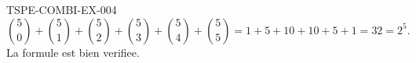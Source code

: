 \begin{corrige}{TSPE-COMBI-EX-004}
\[
  \binom{5}{0}+\binom{5}{1}+\binom{5}{2}+\binom{5}{3}+\binom{5}{4}+\binom{5}{5} = 1+5+10+10+5+1 = 32 = 2^5.
\]
La formule est bien verifiee.
\end{corrige}
